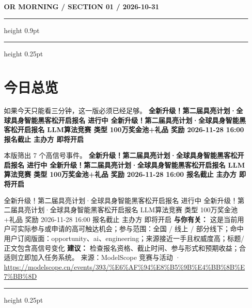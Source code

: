 \documentclass[10.5pt]{ctexart}
\begin{document}
{\small\bfseries OR MORNING / SECTION 01 / 2026-10-31}
\vspace{2mm}
\hrule height 0.9pt
\vspace{1.5mm}
\hrule height 0.25pt
\vspace{4mm}
\section*{今日总览}
{\color{ormuted} 如果今天只能看三分钟，这一版必须已经足够。}
\vspace{2mm}
{\fontsize{25}{29}\selectfont\bfseries 全新升级！第二届具亮计划·全球具身智能黑客松开启报名 进行中 全新升级！第二届具亮计划·全球具身智能黑客松开启报名 LLM算法竞赛 类型 100万奖金池+礼品 奖励 2026-11-28 16:00 报名截止 主办方 即将开启}\par
\vspace{2mm}
{\large 本版筛出 7 个高信号事件。}
\vspace{3mm}
{\Large\bfseries 全新升级！第二届具亮计划·全球具身智能黑客松开启报名 进行中 全新升级！第二届具亮计划·全球具身智能黑客松开启报名 LLM算法竞赛 类型 100万奖金池+礼品 奖励 2026-11-28 16:00 报名截止 主办方 即将开启}\par
全新升级！第二届具亮计划·全球具身智能黑客松开启报名 进行中 全新升级！第二届具亮计划·全球具身智能黑客松开启报名 LLM算法竞赛 类型 100万奖金池+礼品 奖励 2026-11-28 16:00 报名截止 主办方 即将开启
\textbf{与你有关：} 这是当前用户可实际参与或申请的高可触达机会；参与范围：全国 / 线上 / 部分线下；命中用户订阅版面：opportunity、ai、engineering；来源接近一手且权威度高；标题/正文包含高信号变化
\textbf{建议：} 检查报名资格、截止时间、参与形式和预期收益；合适则立即加入任务系统。
{\footnotesize\color{ormuted} 来源：ModelScope 竞赛与活动 · \url{https://modelscope.cn/events/393/%E6%AF%94%E8%B5%9B%E4%BB%8B%E7%BB%8D}}
\vspace{3mm}
\hrule height 0.25pt
\vspace{3mm}
\end{document}

